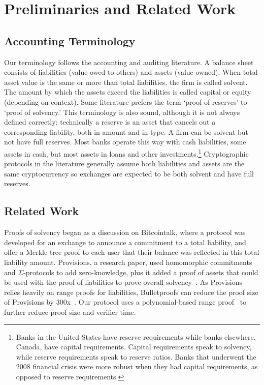 \chapter{Preliminaries and Related Work}

\section{Accounting Terminology}

Our terminology follows the accounting and auditing literature. A balance sheet consists of liabilities (value owed to others) and assets (value owned). When total asset value is the same or more than total liabilities, the firm is called solvent. The amount by which the assets exceed the liabilities is called capital or equity (depending on context). Some literature prefers the term `proof of reserves' to `proof of solvency.' This terminology is also sound, although it is not always defined correctly: technically a reserve is an asset that cancels out a corresponding liability, both in amount and in type. A firm can be solvent but not have full reserves. Most banks operate this way with cash liabilities, some assets in cash, but most assets in loans and other investments.\footnote{Banks in the United States have reserve requirements while banks elsewhere, \eg Canada, have capital requirements. Capital requirements speak to solvency, while reserve requirements speak to reserve ratios. Banks that underwent the 2008 financial crisis were more robust when they had capital requirements, as opposed to reserve requirements.} Cryptographic protocols in the literature generally assume both liabilities and assets are the same cryptocurrency so exchanges are expected to be both solvent and have full reserves.

\section{Related Work}
\label{sec:rw}

Proofs of solvency began as a discussion on Bitcointalk, where a protocol was developed for an exchange to announce a commitment to a total liability, and offer a Merkle-tree proof to each user that their balance was reflected in this total liability amount. Provisions, a research paper, used homomorphic commitments and $\Sigma$-protocols to add zero-knowledge, plus it added a proof of assets that could be used with the proof of liabilities to prove overall solvency~\cite{provisions}. As Provisions relies heavily on range proofs for liabilities, Bulletproofs can reduce the proof size of Provisions by 300x~\cite{bulletproofs}. Our protocol uses a polynomial-based range proof~\cite{rangeproof} to further reduce proof size and verifier time.

